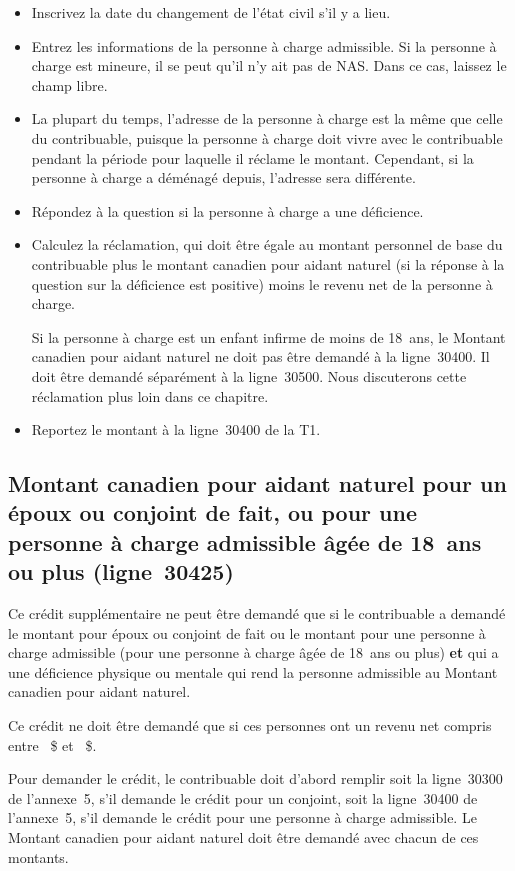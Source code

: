 \begin{itemize}
	\item Inscrivez la date du changement de l'état civil s'il y a lieu.
	\item Entrez les informations de la personne à charge admissible. Si la personne à charge est mineure, il se peut qu'il n'y ait pas de NAS. Dans ce cas, laissez le champ libre. 
	\item La plupart du temps, l'adresse de la personne à charge est la même que celle du contribuable, puisque la personne à charge doit vivre avec le contribuable pendant la période pour laquelle il réclame le montant. Cependant, si la personne à charge a déménagé depuis, l'adresse sera différente.
	\item Répondez à la question si la personne à charge a une déficience.
	\item Calculez la réclamation, qui doit être égale au montant personnel de base du contribuable plus le montant canadien pour aidant naturel (si la réponse à la question sur la déficience est positive) moins le revenu net de la personne à charge.
	\begin{note}
		Si la personne à charge est un enfant infirme de moins de 18~ans, le Montant canadien pour aidant naturel ne doit pas être demandé à la ligne~30400. Il doit être demandé séparément à la ligne~30500. Nous discuterons cette réclamation plus loin dans ce chapitre.
	\end{note}
	\item Reportez le montant à la ligne~30400 de la T1.
\end{itemize}


\subsection{Montant canadien pour aidant naturel pour un époux ou conjoint de fait, ou pour une personne à charge admissible âgée de 18~ans ou plus (ligne~30425)}
Ce crédit supplémentaire ne peut être demandé que si le contribuable a demandé le montant pour époux ou conjoint de fait ou le montant pour une personne à charge admissible (pour une personne à charge âgée de 18~ans ou plus) \textbf{et} qui a une déficience physique ou mentale qui rend la personne admissible au Montant canadien pour aidant naturel. 

Ce crédit ne doit être demandé que si ces personnes ont un revenu net compris entre ~\$ et ~\$. 

Pour demander le crédit, le contribuable doit d'abord remplir soit la ligne~30300 de l'annexe~5, s'il demande le crédit pour un conjoint, soit la ligne~30400 de l'annexe~5, s'il demande le crédit pour une personne à charge admissible. Le Montant canadien pour aidant naturel doit être demandé avec chacun de ces montants.


